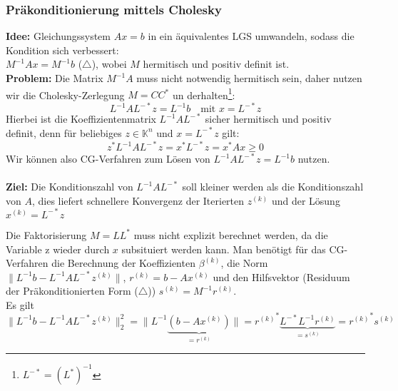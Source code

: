 \documentclass{article}
\begin{document}
    \subsubsection{Präkonditionierung mittels Cholesky}
    \textbf{Idee:} Gleichungssystem $Ax=b$ in ein äquivalentes LGS umwandeln, sodass die Kondition sich verbessert:\\
    $M^{-1}Ax = M^{-1}b$ ({\scriptsize$\triangle$}), wobei $M$ hermitisch und positiv definit ist. \\
    \textbf{Problem:} Die Matrix $M^{-1}A$ muss nicht notwendig hermitisch sein, daher nutzen wir die 
    Cholesky-Zerlegung $M=CC^*$
    un derhalten\footnote{$L^{-*} = (L^*)^{-1}$}: 
    \[L^{-1}AL^{-*}z = L^{-1}b \quad \text{mit } x = L^{-*}z\]
    Hierbei ist die Koeffizientenmatrix $L^{-1}AL^{-*}$ sicher hermitisch und positiv definit, 
    denn für beliebiges $z\in\mathbb{K}^n$ und $x=L^{-*}z$ gilt: 
    \[z^*L^{-1}AL^{-*}z = x^*L^{-*}z = x^*Ax \geq 0\]
    Wir können also CG-Verfahren zum Lösen von $L^{-1}AL^{-*}z = L^{-1}b$ nutzen. \\ \\
    \textbf{Ziel:} Die Konditionszahl von $L^{-1}AL^{-*}$ soll kleiner werden als die Konditionszahl von $A$, dies 
    liefert schnellere Konvergenz der Iterierten $z^{(k)}$ und der Lösung $x^{(k)}=L^{-*}z$ 
    \begin{rembox}
        Die Faktorisierung $M=LL^*$ muss nicht explizit berechnet werden, 
        da die Variable z wieder durch $x$ subsituiert werden kann.
        Man benötigt für das CG-Verfahren die Berechnung der Koeffizienten $\beta^{(k)}$, 
        die Norm $\|L^{-1}b-L^{-1}AL^{-*}z^{(k)}\|$, $r^{(k)} = b-Ax^{(k)}$ und den Hilfsvektor 
        (Residuum der Präkonditionierten Form ({\scriptsize$\triangle$})) $s^{(k)} = M^{-1}r^{(k)}$. \\
        Es gilt 
        \[\|L^{-1}b-L^{-1}AL^{-*}z^{(k)}\|_2^2 = \|L^{-1}\underbrace{(b-Ax^{(k)})}_{=r^{(k)}}\| = 
        {r^{(k)}}^*\underbrace{L^{-*}L^{-1}r^{(k)}}_{=s^{(k)}} = {r^{(k)}}^*s^{(k)}\]
    \end{rembox}
\end{document}
